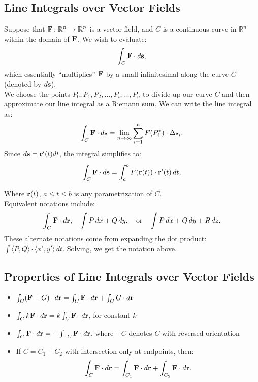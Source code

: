 \subsection{Line Integrals over Vector Fields}
Suppose that \(\mathbf{F} \colon \mathbb{R}^n \to \mathbb{R}^n\) is a vector field, and \(C\) is a continuous curve in \(\mathbb{R}^n\) within the domain of \(\mathbf{F}\). We wish to evaluate:
\[
    \int_C \mathbf{F} \cdot d\mathbf{s}, 
\]
which essentially ``multiplies'' \(\mathbf{F}\) by a small infinitesimal along the curve \(C\) (denoted by \(d\mathbf{s}\)). \\

We choose the points \(P_{0}, P_{1}, P_{2}, \ldots, P_{i},\ldots, P_{n}\) to divide up our curve \(C\) and then approximate our line integral as a Riemann sum. We can write the line integral as:
\[
    \int_C \mathbf{F} \cdot d\mathbf{s} = \lim_{n\to\infty} \sum_{i=1}^{n} F(P^*_i) \cdot \Delta \mathbf{s}_i. 
\]
Since \(d\mathbf{s} = \mathbf{r}'(t) dt\), the integral simplifies to:
\[
    \int_C \mathbf{F} \cdot d\mathbf{s} = \int_a^b F(\mathbf{r}(t)) \cdot \mathbf{r}'(t) \, dt, 
\]

Where \(\mathbf{r}(t)\), \(a \leq t \leq b\) is any parametrization of \(C\). \\ 

Equivalent notations include:
\[
    \int_C \mathbf{F} \cdot d\mathbf{r}, \quad \int P \, dx + Q \, dy, \quad \text{or} \quad \int P \, dx + Q \, dy + R \, dz. 
\]
These alternate notations come from expanding the dot product: \(\int\langle P,Q \rangle \cdot \langle x', y' \rangle \, dt\). Solving, we get the notation above.

\subsection{Properties of Line Integrals over Vector Fields}
\begin{itemize}
    \item \(\int_C (\mathbf{F} + G) \cdot d\mathbf{r} = \int_C \mathbf{F} \cdot d\mathbf{r} + \int_C G \cdot d\mathbf{r}\)
    \item \(\int_C k\mathbf{F} \cdot d\mathbf{r} = k \int_C \mathbf{F} \cdot d\mathbf{r}\), for constant \(k\)
    \item \(\int_C \mathbf{F} \cdot d\mathbf{r} = - \int_{-C} \mathbf{F} \cdot d\mathbf{r}\), where \(-C\) denotes \(C\) with reversed orientation
    \item If \(C = C_1 + C_2\) with intersection only at endpoints, then:
    \[
    \int_C \mathbf{F} \cdot d\mathbf{r} = \int_{C_1} \mathbf{F} \cdot d\mathbf{r} + \int_{C_2} \mathbf{F} \cdot d\mathbf{r}. 
\]
\end{itemize}

